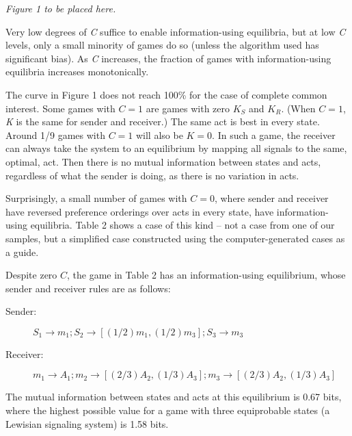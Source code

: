 \documentclass[10pt]{article}
\begin{document}
\emph{Figure 1 to be placed here.}

Very low degrees of \emph{C} suffice to enable information-using
equilibria, but at low \emph{C} levels, only a small minority of games
do so (unless the algorithm used has significant bias). As \emph{C}
increases, the fraction of games with information-using equilibria
increases monotonically.

The curve in Figure 1 does not reach 100\% for the case of complete
common interest. Some games with $C=1$ are games with zero
$K_{S}$ and $K_{R}$. (When $C=1$, \emph{K} is the
same for sender and receiver.) The same act is best in every state. Around 1/9 games with $C=1$ will also be $K=0$. In such a game, the
receiver can always take the system to an equilibrium by mapping all
signals to the same, optimal, act. Then there is no mutual information
between states and acts, regardless of what the sender is doing, as
there is no variation in acts.

Surprisingly, a small number of games with $C=0$, where sender and
receiver have reversed preference orderings over acts in every state,
have information-using equilibria. Table 2 shows a case of this kind --
not a case from one of our samples, but a simplified case constructed
using the computer-generated cases as a guide.

Despite zero $C$, the game in Table 2 has an information-using
equilibrium, whose sender and receiver rules are as follows:

\begin{description}
\item[Sender:]
$S_1\rightarrow m_1;S_2\rightarrow [(1/2)m_1, (1/2)m_3]; S_3\rightarrow m_3$
\item[Receiver:]
$m_1\rightarrow A_1; m_2\rightarrow [(2/3)A_2, (1/3)A_3]; m_3\rightarrow [(2/3)A_2, (1/3)A_3]$
\end{description}

The mutual information between states and acts at this equilibrium is
0.67 bits, where the highest possible value for a game with three
equiprobable states (a Lewisian signaling system) is 1.58 bits.
\end{document}
